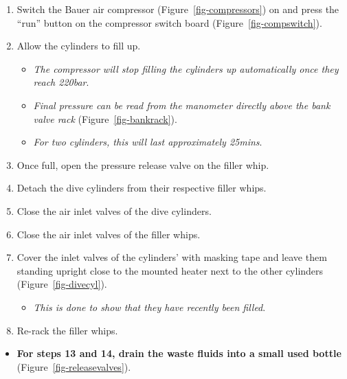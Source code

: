 \documentclass[
  12pt,
]{report}
\providecommand{\tightlist}{%
  \setlength{\itemsep}{0pt}\setlength{\parskip}{0pt}}\usepackage{longtable,booktabs,array}
\begin{document}
\begin{enumerate}
\def\labelenumi{\arabic{enumi}.}
\setcounter{enumi}{6}
\tightlist
\item
  Switch the Bauer air compressor (Figure~\ref{fig-compressors}) on and
  press the ``run'' button on the compressor switch board
  (Figure~\ref{fig-compswitch}).
\item
  Allow the cylinders to fill up.

  \begin{itemize}
  \tightlist
  \item
    \emph{The compressor will stop filling the cylinders up
    automatically once they reach 220bar}.
  \item
    \emph{Final pressure can be read from the manometer directly above
    the bank valve rack} (Figure~\ref{fig-bankrack}).
  \item
    \emph{For two cylinders, this will last approximately 25mins}.
  \end{itemize}
\item
  Once full, open the pressure release valve on the filler whip.
\item
  Detach the dive cylinders from their respective filler whips.
\item
  Close the air inlet valves of the dive cylinders.
\item
  Close the air inlet valves of the filler whips.
\item
  Cover the inlet valves of the cylinders' with masking tape and leave
  them standing upright close to the mounted heater next to the other
  cylinders (Figure~\ref{fig-divecyl}).

  \begin{itemize}
  \tightlist
  \item
    \emph{This is done to show that they have recently been filled}.
  \end{itemize}
\item
  Re-rack the filler whips.
\end{enumerate}

\begin{itemize}
\tightlist
\item
  \textbf{For steps 13 and 14, drain the waste fluids into a small used
  bottle} (Figure~\ref{fig-releasevalves}).
\end{itemize}
\end{document}
